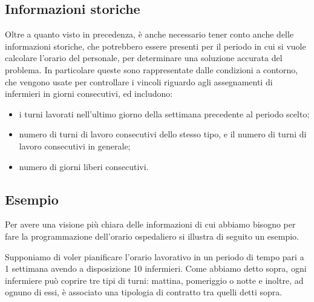 \subsection{Informazioni storiche}
Oltre a quanto visto in precedenza, è anche necessario tener conto anche delle informazioni storiche, che potrebbero essere presenti per il periodo in cui si vuole calcolare l'orario del personale, per determinare una soluzione accurata del problema.
In particolare queste sono rappresentate dalle condizioni a contorno, che vengono usate per controllare i vincoli riguardo agli assegnamenti di infermieri in giorni consecutivi, ed includono:
\begin{itemize}
\item i turni lavorati nell'ultimo giorno della settimana precedente al periodo scelto;
\item numero di turni di lavoro consecutivi dello stesso tipo, e il numero di turni di lavoro consecutivi in generale;
\item numero di giorni liberi consecutivi.
\end{itemize}

\subsection{Esempio}
Per avere una visione più chiara delle informazioni di cui abbiamo bisogno per fare la programmazione dell'orario ospedaliero si illustra di seguito un esempio.

Supponiamo di voler pianificare l'orario lavorativo in un periodo di tempo pari a 1 settimana avendo a disposizione 10 infermieri.
Come abbiamo detto sopra, ogni infermiere può coprire tre tipi di turni: mattina, pomeriggio o notte e inoltre, ad ognuno di essi, è associato una tipologia di contratto tra quelli detti sopra. 

%



